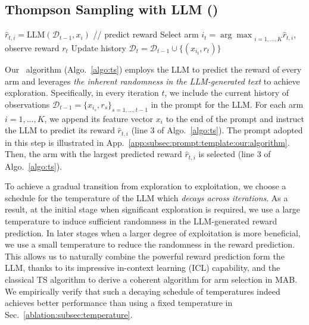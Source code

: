 \subsection{Thompson Sampling with LLM (\algts)}
\label{subsec:algo:ts}
\begin{algorithm}
\begin{algorithmic}[1]
                \STATE $\widehat{r}_{t,i} = \text{LLM}(\mathcal{D}_{t-1}, x_i)$ // predict reward
            \ENDFOR
            \STATE Select arm $i_t = {\arg\max}_{i=1,\ldots,K}\widehat{r}_{t,i}$, observe reward $r_t$
            \STATE Update history $\mathcal{D}_t = \mathcal{D}_{t-1} \cup \{(x_{i_t},r_t)\}$
        \ENDFOR
\end{algorithmic}
\caption{\algts}
\label{algo:ts}
\end{algorithm}

Our \algts~algorithm (Algo.~\ref{algo:ts}) employs the LLM to predict the reward of every arm and leverages \emph{the inherent randomness in the LLM-generated text} to achieve exploration. 
Specifically, in every iteration $t$, we include the current history of observations $\mathcal{D}_{t-1}=\{x_{i_s}, r_s\}_{s=1,\ldots,t-1}$ in the prompt for the LLM.
For each arm $i=1,\ldots,K$, we append its feature vector $x_i$ to the end of the prompt and instruct the LLM to predict its reward $\widehat{r}_{t,i}$ (line 3 of Algo.~\ref{algo:ts}).
The prompt adopted in this step is illustrated in 
App.~\ref{app:subsec:prompt:template:our:algorithm}.
Then, the arm with the largest predicted reward $\widehat{r}_{t,i}$ is selected (line 3 of Algo.~\ref{algo:ts}).

To achieve a gradual transition from exploration to exploitation, we choose a schedule for the temperature of the LLM which \emph{decays across iterations}. 
As a result, at the initial stage when significant exploration is required, we use a large temperature to induce sufficient randomness in the LLM-generated reward prediction. 
In later stages when a larger degree of exploitation is more beneficial, we use a small temperature to reduce the randomness in the reward prediction.
This allows us to naturally combine the powerful reward prediction form the LLM, thanks to its impressive in-context learning (ICL) capability, and the classical TS algorithm to derive a coherent algorithm for arm selection in MAB.
We empirically verify that such a decaying schedule of temperatures indeed achieves better performance than using a fixed temperature in Sec.~\ref{ablation:subsec:temperature}.


